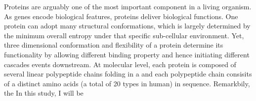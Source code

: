Proteins are arguably one of the most important component in a living organism. As genes encode biological features, proteins deliver biological functions. One protein can adopt many structural conformations, which is largely determined by the minimum overall entropy under that specific sub-cellular environment. Yet, three dimensional conformation and flexibility of a protein determine its functionality by allowing different binding property and hence initiating different cascades events downstream. At molecular level, each protein is composed of several linear polypeptide chains folding in a and each polypeptide chain consisits of a distinct amino acids (a total of 20 types in human) in sequence. Remarkbily, the  In this study, I will be 